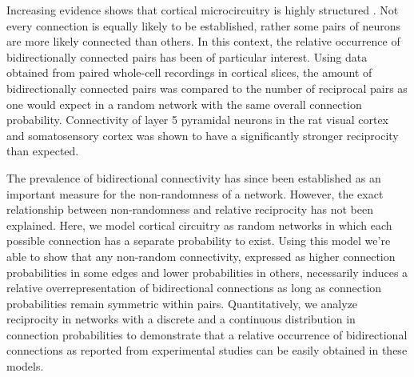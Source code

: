 

Increasing evidence shows that cortical microcircuitry is highly structured \cite{Song2005,Perin2011}. Not every connection is equally likely to be established, rather some pairs of neurons are more likely connected than others. In this context, the relative occurrence of bidirectionally connected pairs has been of particular interest. Using data obtained from paired whole-cell recordings in cortical slices, the amount of bidirectionally connected pairs was compared to the number of reciprocal pairs as one would expect in a random network with the same overall connection probability. Connectivity of layer 5 pyramidal neurons in the rat visual cortex \cite{Song2005} and somatosensory cortex \cite{Markram1997, Perin2011} was shown to have a significantly stronger reciprocity than expected.



The prevalence of bidirectional connectivity has since been established as an important measure for the non-randomness of a network. However, the exact relationship between non-randomness and relative reciprocity has not been explained. Here, we model cortical circuitry as random networks in which each possible connection has a separate probability to exist. Using this model we're able to show that any non-random connectivity, expressed as higher connection probabilities in some edges and lower probabilities in others, necessarily induces a relative overrepresentation of bidirectional connections as long as connection probabilities remain symmetric within pairs. Quantitatively, we analyze reciprocity in networks with a discrete and a continuous distribution in connection probabilities to demonstrate that a relative occurrence of bidirectional connections as reported from experimental studies can be easily obtained in these models.


